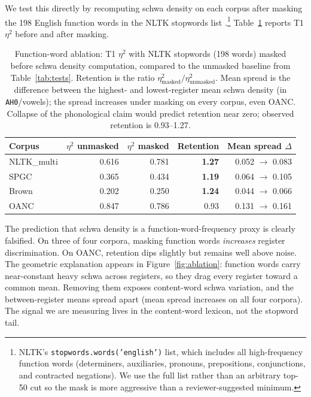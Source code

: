 \documentclass[11pt,a4paper]{article}
\begin{document}
We test this directly by recomputing schwa density on each corpus
after masking the 198 English function words in the NLTK stopwords list
\citep{nltk}.\footnote{NLTK's \texttt{stopwords.words('english')} list,
which includes all high-frequency function words (determiners,
auxiliaries, pronouns, prepositions, conjunctions, and contracted
negations). We use the full list rather than an arbitrary top-50 cut
so the mask is more aggressive than a reviewer-suggested minimum.}
Table~\ref{tab:ablation} reports T1 \(\eta^2\) before and after masking.

\begin{table}[ht]
\centering
\small
\begin{tabular}{lrrrr}
\toprule
Corpus & \(\eta^2\) unmasked & \(\eta^2\) masked & Retention & Mean spread $\Delta$ \\
\midrule
NLTK\_multi & 0.616 & 0.781 & \textbf{1.27} & 0.052 $\to$ 0.083 \\
SPGC        & 0.365 & 0.434 & \textbf{1.19} & 0.064 $\to$ 0.105 \\
Brown       & 0.202 & 0.250 & \textbf{1.24} & 0.044 $\to$ 0.066 \\
OANC        & 0.847 & 0.786 & 0.93 & 0.131 $\to$ 0.161 \\
\bottomrule
\end{tabular}
\caption{Function-word ablation: T1 \(\eta^2\) with NLTK stopwords
(198 words) masked before schwa density computation, compared to the
unmasked baseline from Table~\ref{tab:tests}. Retention is the ratio
\(\eta^2_{\text{masked}} / \eta^2_{\text{unmasked}}\). Mean spread is
the difference between the highest- and lowest-register mean schwa
density (in \texttt{AH0}/vowels); the spread increases under masking on
every corpus, even OANC. Collapse of the phonological claim would
predict retention near zero; observed retention is 0.93--1.27.}
\label{tab:ablation}
\end{table}

The prediction that schwa density is a function-word-frequency proxy
is clearly falsified. On three of four corpora, masking function words
\emph{increases} register discrimination. On OANC, retention dips
slightly but remains well above noise. The geometric explanation
appears in Figure~\ref{fig:ablation}: function words carry near-constant
heavy schwa across registers, so they drag every register toward a
common mean. Removing them exposes content-word schwa variation, and
the between-register means spread apart (mean spread increases on all
four corpora). The signal we are measuring lives in the content-word
lexicon, not the stopword tail.
\end{document}
